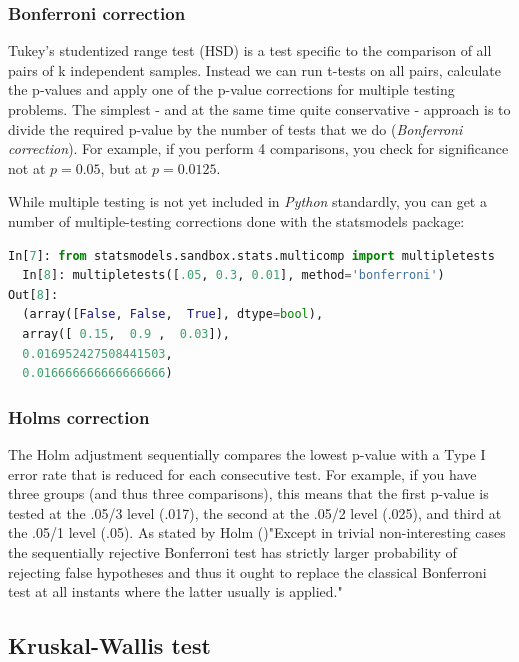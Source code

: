 \subsubsection{Bonferroni correction}

Tukey's studentized range test (HSD) is a test specific to the comparison of all pairs of k independent samples. Instead we can run t-tests on all pairs, calculate the p-values and apply one of the p-value corrections for multiple testing problems. The simplest - and at the same time quite conservative - approach is to divide the required p-value by the number of tests that we do (\emph{Bonferroni correction}). For example, if you perform 4 comparisons, you check for significance not at $p=0.05$, but at $p=0.0125$.

While multiple testing is not yet included in \emph{Python} standardly, you can get a number of multiple-testing corrections done with the statsmodels package:

\begin{lstlisting}[language=Python]
  In[7]: from statsmodels.sandbox.stats.multicomp import multipletests
  In[8]: multipletests([.05, 0.3, 0.01], method='bonferroni')
Out[8]:
  (array([False, False,  True], dtype=bool),
  array([ 0.15,  0.9 ,  0.03]),
  0.016952427508441503,
  0.016666666666666666)
\end{lstlisting}

\subsubsection{Holms correction}

The Holm adjustment sequentially compares the lowest p-value with a Type I error rate that is reduced for each consecutive test. For example, if you have three groups (and thus three comparisons), this means that the first p-value is tested at the .05/3 level (.017), the second at the .05/2 level (.025), and third at the .05/1 level (.05).
As stated by Holm (\cite{Holm1979})"Except in trivial non-interesting cases the sequentially rejective Bonferroni test has strictly larger probability of rejecting false hypotheses and thus it ought to replace the classical Bonferroni test at all instants where the latter usually is applied."

\subsection{Kruskal-Wallis test}\label{test:Kruskal-Wallis}

